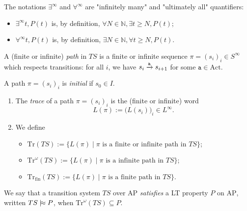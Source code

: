 \documentclass[./main]{subfiles}
\begin{document}
  \begin{en-rmk}
    The notations $\exists^\infty$ and $\forall^\infty$ are "infinitely many" and "ultimately all" quantifiers:
    \begin{itemize}
      \item $\exists^\infty t, P(t)$ is, by definition, $\forall N \in \mathds{N}, \exists t \ge N, P(t)$;
      \item $\forall^\infty t, P(t)$ is, by definition, $\exists N \in \mathds{N}, \forall t \ge N, P(t)$.
    \end{itemize}
  \end{en-rmk}

  \begin{en-defn}
    A (finite or infinite) \textit{path} in $TS$ is a finite or infinite sequence $\pi = (s_i)_{i} \in S^\infty$ which respects transitions: for all $i$, we have $s_i \mathrel{\xrightarrow{\mathtt{a}}} s_{i+1}$ for some $\mathtt{a} \in \mathrm{Act}$.

    A path $\pi = (s_i)_i$ is \textit{initial} if $s_0 \in I$.
  \end{en-defn}

  \begin{en-defn}[Trace]
    \begin{enumerate}
      \item The \textit{trace} of a path $\pi = (s_i)_i$ is the (finite or infinite) word 
        \[
        L(\pi) := \big(L(s_i)\big)_i \in L^\infty
        .\]
      \item We define
        \begin{itemize}
          \item $\mathrm{Tr}(TS) := \{L(\pi)  \mid \pi \text{ is a finite or infinite path in } TS\}$;
          \item $\mathrm{Tr}^\omega(TS) := \{L(\pi)  \mid \pi \text{ is a infinite path in } TS\}$;
          \item $\mathrm{Tr}_\mathrm{fin}(TS) := \{L(\pi)  \mid \pi \text{ is a finite path in } TS\}$.
        \end{itemize}
    \end{enumerate}
  \end{en-defn}

  \begin{en-defn}
    We say that a transition system $TS$ over $\mathrm{AP}$ \textit{satisfies} a LT property $P$ on $\mathrm{AP}$, written $TS \mathrel{{|}\!{\approx}} P$, when $\mathrm{Tr}^\omega(TS) \subseteq P$.
  \end{en-defn}
\end{document}
